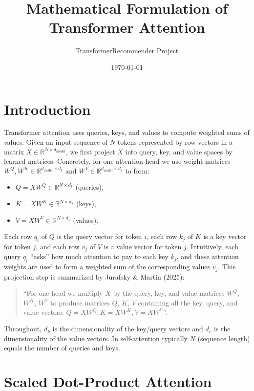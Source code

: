 \documentclass[11pt,a4paper]{article}
\title{\textbf{Mathematical Formulation of Transformer Attention}}
\author{TransformerRecommender Project}
\date{\today}
\begin{document}
\maketitle

\section{Introduction}

Transformer attention uses queries, keys, and values to compute weighted sums of values. Given an input sequence of $N$ tokens represented by row vectors in a matrix $X\in\mathbb{R}^{N\times d_{\text{model}}}$, we first project $X$ into query, key, and value spaces by learned matrices. Concretely, for one attention head we use weight matrices $W^Q,W^K\in\mathbb{R}^{d_{\text{model}}\times d_k}$ and $W^V\in\mathbb{R}^{d_{\text{model}}\times d_v}$ to form:

\begin{itemize}
\item $Q = XW^Q \in \mathbb{R}^{N\times d_k}$ (queries),
\item $K = XW^K \in \mathbb{R}^{N\times d_k}$ (keys),
\item $V = XW^V \in \mathbb{R}^{N\times d_v}$ (values).
\end{itemize}

Each row $q_i$ of $Q$ is the query vector for token $i$, each row $k_j$ of $K$ is a key vector for token $j$, and each row $v_j$ of $V$ is a value vector for token $j$. Intuitively, each query $q_i$ ``asks'' how much attention to pay to each key $k_j$, and these attention weights are used to form a weighted sum of the corresponding values $v_j$. This projection step is summarized by Jurafsky \& Martin (2025):

\begin{quote}
``For one head we multiply $X$ by the query, key, and value matrices $W^Q$, $W^K$, $W^V$ to produce matrices $Q$, $K$, $V$ containing all the key, query, and value vectors: $Q=XW^Q, K=XW^K, V=XW^V$''.
\end{quote}

Throughout, $d_k$ is the dimensionality of the key/query vectors and $d_v$ is the dimensionality of the value vectors. In self-attention typically $N$ (sequence length) equals the number of queries and keys.

\section{Scaled Dot-Product Attention}
\end{document}
